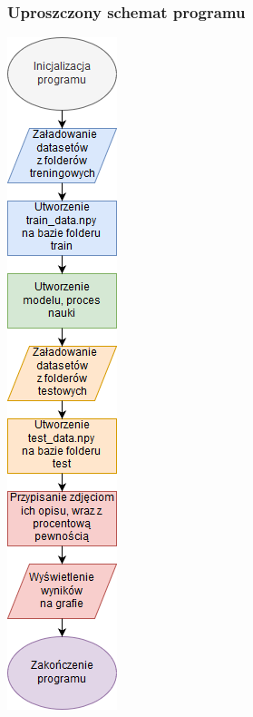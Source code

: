\documentclass[12pt,a4paper]{article}
\begin{document}
	\subsubsection{Uproszczony schemat programu}
	\begin{center}
        \includegraphics[scale=0.70]{schemat.png}
    \end{center}
    
\end{document}
